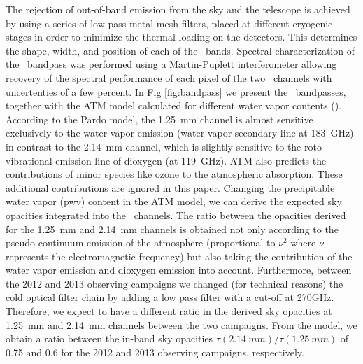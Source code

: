    The rejection of out-of-band emission from the sky and the telescope is achieved
   by using a series of low-pass metal mesh filters, placed at different
   cryogenic stages in order to minimize the thermal loading on the
   detectors. This determines the shape, width, and position of each of the \NIKA\
   bands.  Spectral characterization of the \NIKA\ bandpass was performed using a
   Martin-Puplett interferometer allowing recovery of the spectral performance
   of each pixel of the two \NIKA\ channels with uncertenties of a few
   percent. In Fig \ref{fig:bandpass} we present the \NIKA\ bandpasses, together
   with the ATM model calculated for different water vapor contents
   (\cite{2001IEEE....49.1683C}). According to the Pardo model, the 1.25~mm
   channel is almost sensitive exclusively to the water vapor emission (water vapor
   secondary line at 183~GHz) in contrast to the 2.14~mm channel, which is slightly sensitive to the roto-vibrational emission line of dioxygen (at 119~GHz). ATM also predicts the 
   contributions of minor species like ozone to the atmospheric absorption. These
   additional contributions are ignored in this paper. Changing the
   precipitable water vapor (pwv) content in the ATM model, we can derive the
   expected sky opacities integrated into the \NIKA\ channels. The ratio between the
   opacities derived for the 1.25~mm and 2.14~mm channels is obtained not only
   according to the pseudo continuum emission of the atmosphere (proportional
   to $\nu^2$ where $\nu$ represents the electromagnetic frequency) but also taking the contribution of the water vapor emission and dioxygen emission into account.  Furthermore, between the 2012 and 2013
   observing campaigns we changed (for technical reasons) the cold optical filter 
   chain by adding a low pass filter with a
   cut-off at 270GHz. Therefore, we expect to have a different ratio in the
   derived sky opacities at 1.25~mm and 2.14~mm channels between the two campaigns. From
   the model, we obtain a ratio between the in-band sky opacities $\tau(2.14~mm)/\tau(1.25~mm)$ of 0.75 and 0.6 for the 2012 and 2013 observing campaigns, respectively.


